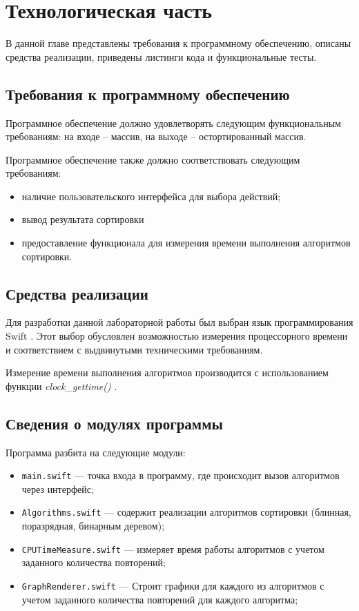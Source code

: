 \chapter{Технологическая часть}

В данной главе представлены требования к программному обеспечению, описаны средства реализации, приведены листинги кода и функциональные тесты.

\section{Требования к программному обеспечению}\label{section:requirements}

Программное обеспечение должно удовлетворять следующим функциональным требованиям: на входе -- массив, на выходе -- остортированный массив.

Программное обеспечение также должно соответствовать следующим требованиям:
\begin{itemize}[label=---]
	\item наличие пользовательского интерфейса для выбора действий;
	\item вывод результата сортировки
	\item предоставление функционала для измерения времени выполнения алгоритмов сортировки.
\end{itemize}

\section{Средства реализации}

Для разработки данной лабораторной работы был выбран язык программирования Swift \cite{swift}. 
Этот выбор обусловлен возможностью измерения процессорного времени \cite{cpu-time-measure} и соответствием с выдвинутыми техническими требованиям.

Измерение времени выполнения алгоритмов производится с использованием функции \textit{clock\_gettime()} \cite{cpu-time-measure}.

\section{Сведения о модулях программы}

Программа разбита на следующие модули:

\begin{itemize}
	\item \texttt{main.swift} --- точка входа в программу, где происходит вызов алгоритмов через интерфейс;
	\item \texttt{Algorithms.swift} --- содержит реализации алгоритмов сортировки (блинная, поразрядная, бинарным деревом);
	\item \texttt{CPUTimeMeasure.swift} --- измеряет время работы алгоритмов с учетом заданного количества повторений;
	\item \texttt{GraphRenderer.swift} --- Строит графики для каждого из алгоритмов с учетом заданного количества повторений для каждого алгоритма;
\end{itemize}

